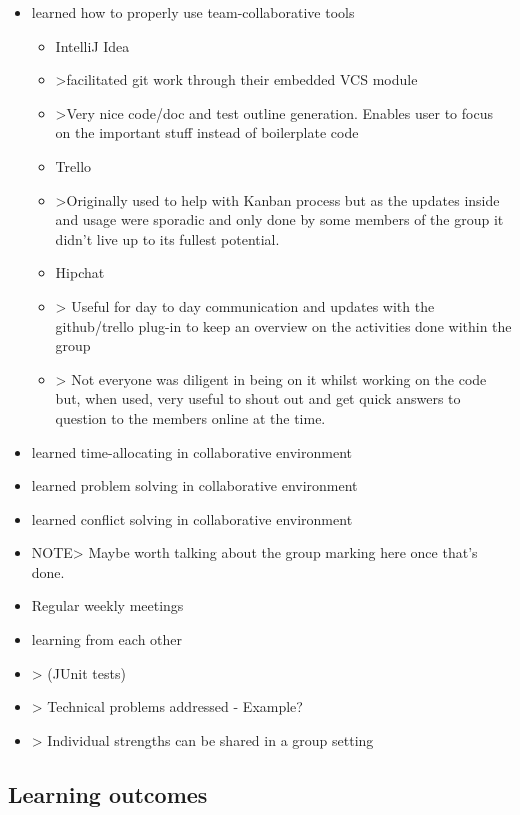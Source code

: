 \begin{itemize}
    \item learned how to properly use team-collaborative tools
    \begin{itemize}
            \item IntelliJ Idea
            \item >facilitated git work through their embedded VCS module
            \item >Very nice code/doc and test outline generation. Enables user to focus on the important stuff instead of boilerplate code
            \item Trello
            \item >Originally used to help with Kanban process but as the updates inside and usage were sporadic and only done by some members of the group it didn't live up to its fullest potential.
            \item Hipchat
            \item > Useful for day to day communication and updates with the github/trello plug-in to keep an overview on the activities done within the group
            \item > Not everyone was diligent in being on it whilst working on the code but, when used, very useful to shout out and get quick answers to question to the members online at the time.
     \end{itemize}

    \item learned time-allocating in collaborative environment
    \item learned  problem solving in collaborative environment
    \item learned  conflict solving in collaborative environment
    \item NOTE> Maybe worth talking about the group marking here once that's done.
    \item Regular weekly meetings
    \item learning from each other
    \item > (JUnit tests)
    \item > Technical problems addressed - Example?
    \item > Individual strengths can be shared in a group setting
\end {itemize}
\subsection{Learning outcomes}


